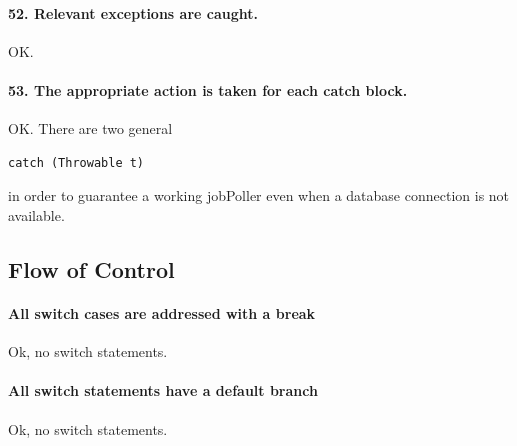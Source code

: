 \documentclass[english]{article}
\begin{document}
\paragraph{52. Relevant exceptions are caught.}
OK.
\paragraph{53. The appropriate action is taken for each catch block.}
OK. There are two general
\begin{lstlisting}
catch (Throwable t)
\end{lstlisting} in order to guarantee a working jobPoller even when a database connection is not available.

\subsection{Flow of Control}
\paragraph{All switch cases are addressed with a break}
Ok, no switch statements.

\paragraph{All switch statements have a default branch}
Ok, no switch statements.
\end{document}

